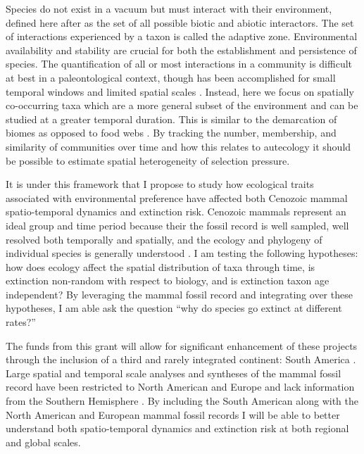 \documentclass[11pt,letterpaper]{article}
\begin{document}
Species do not exist in a vacuum but must interact with their environment, defined here after \citet{Simpson1944} as the set of all possible biotic and abiotic interactors. The set of interactions experienced by a taxon is called the adaptive zone. Environmental availability and stability are crucial for both the establishment and persistence of species. The quantification of all or most interactions in a community is difficult at best in a paleontological context, though has been accomplished for small temporal windows and limited spatial scales \citep{Angielczyk2005,Mitchell2012,Roopnarine2007}. Instead, here we focus on spatially co-occurring taxa which are a more general subset of the environment and can be studied at a greater temporal duration. This is similar to the demarcation of biomes as opposed to food webs \citep{Vilhena2013b}. By tracking the number, membership, and similarity of communities over time and how this relates to autecology it should be possible to estimate spatial heterogeneity of selection pressure.

It is under this framework that I propose to study how ecological traits associated with environmental preference have affected both Cenozoic mammal spatio-temporal dynamics and extinction risk. Cenozoic mammals represent an ideal group and time period because their the fossil record is well sampled, well resolved both temporally and spatially, and the ecology and phylogeny of individual species is generally understood \citep{Alroy2009,Alroy2000g,Jernvall2002,Liow2008,Smith2004}. I am testing the following hypotheses: how does ecology affect the spatial distribution of taxa through time, is extinction non-random with respect to biology, and is extinction taxon age independent? By leveraging the mammal fossil record and integrating over these hypotheses, I am able ask the question ``why do species go extinct at different rates?''

The funds from this grant will allow for significant enhancement of these projects through the inclusion of a third and rarely integrated continent: South America \citep{Stromberg2013,Marshall1982}. Large spatial and temporal scale analyses and syntheses of the mammal fossil record have been restricted to North American and Europe and lack information from the Southern Hemisphere \citep{Jernvall2004,Jernvall2002,Fortelius2002,Janis2000,Alroy1996a,Alroy1998,Alroy2000g,Liow2008,Raia2006,Tomiya2013}. By including the South American along with the North American and European mammal fossil records I will be able to better understand both spatio-temporal dynamics and extinction risk at both regional and global scales. 
\end{document}
